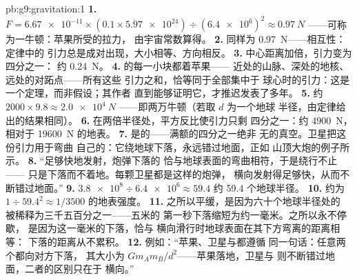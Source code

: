 \begin{solution}{pb:g9:gravitation:1}
\textbf{1.} $F = \num{6.67e-11} \times (0.1 \times
\num{5.97e24}) \div (\num{6.4e6})^2 \approx \qty{0.97}{N}$
——可称为一牛顿：苹果所受的拉力，
由宇宙常数算得。
\textbf{2.} 同样为 \qty{0.97}{N}——相互性：定律中的
引力总是成对出现，大小相等、方向相反。
\textbf{3.} 中心距离加倍，引力变为四分之一：
约 \qty{0.24}{N}。
\textbf{4.} 的每一小块都着苹果——
近处的山脉、深处的地核、远处的对跖点——所有这些
引力之和，恰等同于全部集中于
球心时的引力：这是一个定理，而非假设；其作者
直到能够证明它，才推迟发表了多年。
\textbf{5.} 约 $2000 \times 9.8 \approx \qty{2.0e4}{N}$
——即两万牛顿（若取 $d$ 为一个地球
半径，由定律给出的结果相同）。
\textbf{6.} 在两倍半径处，平方反比使引力只剩
四分之一：约 \qty{4900}{N}，相对于 \qty{19600}{N}
的地表。
\textbf{7.} 是的——满额的四分之一绝非
无的真空。卫星把这份引力用于弯曲
自己的：它绕地球下落，永远错过地面，正如
山顶大炮的例子所示。
\textbf{8.} “足够快地发射，炮弹下落的
恰与地球表面的弯曲相符，于是绕行不止——
只是下落而不着地。每颗卫星都是这样的炮弹，
横向发射得足够快，从而不断错过地面。”
\textbf{9.} $\num{3.8e8} \div \num{6.4e6} \approx 59.4$
约 59.4 个地球半径。
\textbf{10.} 约为 $1 \div 59.4^2 \approx 1/3500$
的地表强度。
\textbf{11.} 之所以平缓，是因为六十个地球半径处的
被稀释为三千五百分之一——五米的
第一秒下落缩短为约一毫米。之所以永不停歇，
是因为这一毫米的下落，恰与
横向滑行时地球表面在其下方弯离的距离相等：
下落的距离从不累积。
\textbf{12.} 例如：“苹果、卫星与都遵循
同一句话：任意两个都向对方下落，
其大小为 $G m_A m_B / d^2$——苹果落地，卫星与
则不断错过地面，二者的区别只在于
横向。”
\end{solution}
